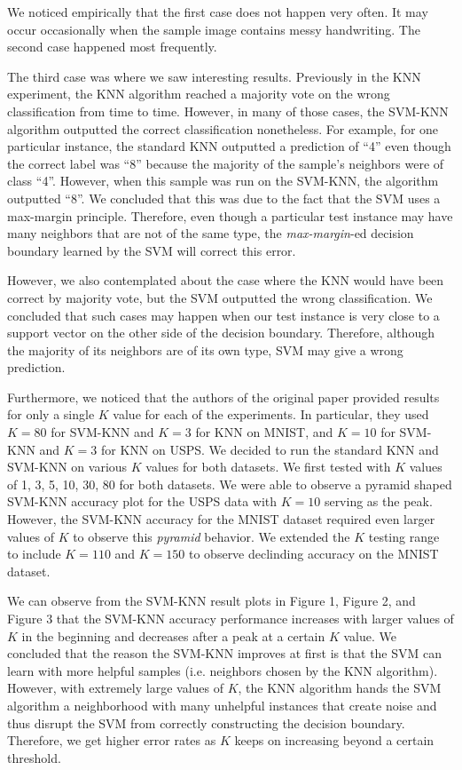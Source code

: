 \documentclass[11pt,letterpaper]{article}
\begin{document}
We noticed empirically that the first case does not happen very often. It may occur occasionally when the sample image contains messy handwriting. The second case happened most frequently.

The third case was where we saw interesting results. Previously in the KNN experiment, the KNN algorithm reached a majority vote on the wrong classification from time to time. However, in many of those cases, the SVM-KNN algorithm outputted the correct classification nonetheless. For example, for one particular instance, the standard KNN outputted a prediction of ``4'' even though the correct label was ``8'' because the majority of the sample's neighbors were of class ``4''. However, when this sample was run on the SVM-KNN, the algorithm outputted ``8''. We concluded that this was due to the fact that the SVM uses a max-margin principle. Therefore, even though a particular test instance may have many neighbors that are not of the same type, the \textit{max-margin}-ed decision boundary learned by the SVM will correct this error.

However, we also contemplated about the case where the KNN would have been correct by majority vote, but the SVM outputted the wrong classification. We concluded that such cases may happen when our test instance is very close to a support vector on the other side of the decision boundary. Therefore, although the majority of its neighbors are of its own type, SVM may give a wrong prediction.

Furthermore, we noticed that the authors of the original paper provided results for only a single $K$ value for each of the experiments. In particular, they used $K=80$ for SVM-KNN and $K=3$ for KNN on MNIST,  and $K=10$ for SVM-KNN and $K=3$ for KNN on USPS. We decided to run the standard KNN and SVM-KNN on various $K$ values for both datasets. We first tested with $K$ values of 1, 3, 5, 10, 30, 80 for both datasets. We were able to observe a pyramid shaped SVM-KNN accuracy plot for the USPS data with $K=10$ serving as the peak. However, the SVM-KNN accuracy for the MNIST dataset required even larger values of $K$ to observe this \textit{pyramid} behavior. We extended the $K$ testing range to include $K=110$ and $K=150$ to observe declinding accuracy on the MNIST dataset.

We can observe from the SVM-KNN result plots in Figure 1, Figure 2, and Figure 3 that the SVM-KNN accuracy performance increases with larger values of $K$ in the beginning and decreases after a peak at a certain $K$ value. We concluded that the reason the SVM-KNN improves at first is that the SVM can learn with more helpful samples (i.e. neighbors chosen by the KNN algorithm). However, with extremely large values of $K$, the KNN algorithm hands the SVM algorithm a neighborhood with many unhelpful instances that create noise and thus disrupt the SVM from correctly constructing the decision boundary. Therefore, we get higher error rates as $K$ keeps on increasing beyond a certain threshold.
 
\end{document}
